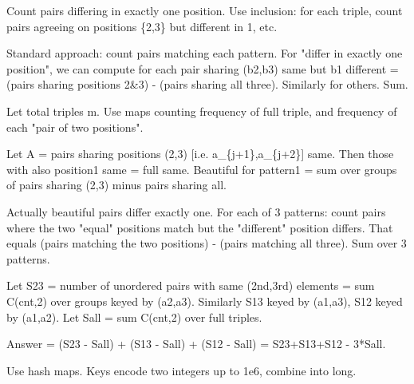 \begin{decodedreasoningpanel}
  Count pairs differing in exactly one position. Use inclusion: for each triple, count pairs agreeing on positions \{2,3\} but different in 1, etc.

Standard approach: count pairs matching each pattern. For "differ in exactly one position", we can compute for each pair sharing (b2,b3) same but b1 different = (pairs sharing positions 2\&3) - (pairs sharing all three). Similarly for others. Sum.

Let total triples m. Use maps counting frequency of full triple, and frequency of each "pair of two positions".

Let A = pairs sharing positions (2,3) [i.e. a\_\{j+1\},a\_\{j+2\}] same. Then those with also position1 same = full same. Beautiful for pattern1 = sum over groups of pairs sharing (2,3) minus pairs sharing all.

Actually beautiful pairs differ exactly one. For each of 3 patterns: count pairs where the two "equal" positions match but the "different" position differs. That equals (pairs matching the two positions) - (pairs matching all three). Sum over 3 patterns.

Let S23 = number of unordered pairs with same (2nd,3rd) elements = sum C(cnt,2) over groups keyed by (a2,a3).
Similarly S13 keyed by (a1,a3), S12 keyed by (a1,a2).
Let Sall = sum C(cnt,2) over full triples.

Answer = (S23 - Sall) + (S13 - Sall) + (S12 - Sall) = S23+S13+S12 - 3*Sall.

Use hash maps. Keys encode two integers up to 1e6, combine into long.
\end{decodedreasoningpanel}
